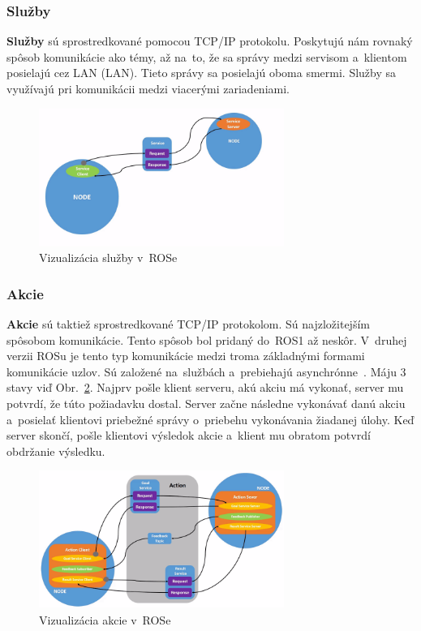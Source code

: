 \newpage
\subsubsection{Služby}
\label{sec:services}

	\textbf {Služby} sú sprostredkované pomocou TCP/IP protokolu. Poskytujú nám rovnaký spôsob komunikácie ako témy, až na~to, že sa správy
	medzi servisom a~klientom posielajú cez LAN (\acrlong{LAN}). Tieto správy sa posielajú oboma smermi. Služby sa využívajú pri komunikácii
	medzi viacerými zariadeniami.

	\begin{figure}[h]
		\centering
		\includegraphics[width=8cm]{img/serviceExplanation.png}
		\caption{Vizualizácia služby v~ROSe~\cite{RosDoc}}
		\label{fig:service}
	\end{figure}

\subsubsection{Akcie}
\label{sec:actions}
	\label{s_action}
	\textbf {Akcie} sú taktiež sprostredkované TCP/IP protokolom. Sú najzložitejším spôsobom komunikácie. Tento spôsob bol pridaný do~ROS1
	až neskôr. V~druhej verzii ROSu je tento typ komunikácie medzi troma základnými formami komunikácie uzlov. Sú založené na~službách
	a~prebiehajú asynchrónne~\cite{ROS2book}. Máju 3 stavy viď Obr.~\ref{fig:action}. Najprv pošle klient serveru, akú akciu má vykonať,
	server mu potvrdí, že túto požiadavku dostal. Server začne následne vykonávať danú akciu a~posielať klientovi priebežné správy o~priebehu
	vykonávania žiadanej úlohy. Keď server skončí, pošle klientovi výsledok akcie a~klient mu obratom potvrdí obdržanie výsledku.

	\begin{figure}[h]
		\centering
		\includegraphics[width=8cm]{img/actionExplanation.png}
		\caption{Vizualizácia akcie v~ROSe~\cite{RosDoc}}
		\label{fig:action}
	\end{figure}

